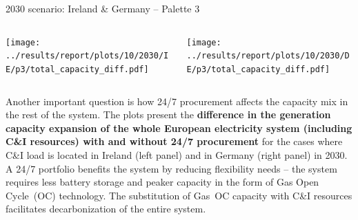 \begin{frame}{2030 scenario: Ireland \& Germany -- Palette 3}

  {\footnotesize

  \begin{columns}
  \begin{column}{7cm}
  \centering
  \texttt{[image: ../results/report/plots/10/2030/IE/p3/total\_capacity\_diff.pdf]}
  \end{column}

  \begin{column}{8cm}
  \centering
  \texttt{[image: ../results/report/plots/10/2030/DE/p3/total\_capacity\_diff.pdf]}
  \end{column}

  \end{columns}

  \begin{columns}
  \begin{column}{15cm}

  Another important question is how 24/7 procurement affects the capacity mix in the rest of the system.
  The plots present the {\bf difference
  in the generation capacity expansion of the whole European electricity system (including C\&I resources)
  with and without 24/7 procurement} for the cases where C\&I load is located in Ireland (left panel) and 
  in Germany (right panel) in 2030.
  A 24/7 portfolio benefits the system by \alert{reducing flexibility needs} -- the system requires 
  less battery storage and peaker capacity in the form of Gas Open Cycle~(OC) technology. 
  The substitution of Gas~OC capacity with C\&I 
  resources \alert{facilitates decarbonization} of the entire system.

  \end{column}
  \end{columns}
  }

\end{frame}



